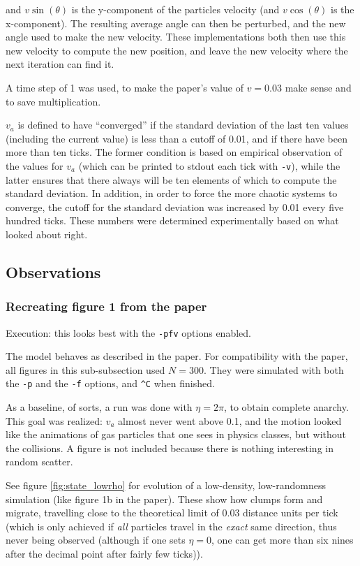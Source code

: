 \documentclass{article}
\begin{document}
\noindent
and $v\sin(\theta)$ is the y-component of the particles velocity (and
$v\cos(\theta)$ is the x-component).  The resulting average angle can then be
perturbed, and the new angle used to make the new velocity.  These
implementations both then use this new velocity to compute the new position, and
leave the new velocity where the next iteration can find it.


A time step of 1 was used, to make the paper's value of $v=0.03$ make sense and
to save multiplication.


$v_a$ is defined to have ``converged'' if the standard deviation of the last ten
values (including the current value) is less than a cutoff of 0.01, and if there
have been more than ten ticks.  The former condition is based on empirical
observation of the values for $v_a$ (which can be printed to stdout each tick
with \verb|-v|), while the latter ensures that there always will be ten elements
of which to compute the standard deviation.  In addition, in order to force the
more chaotic systems to converge, the cutoff for the standard deviation was
increased by 0.01 every five hundred ticks.  These numbers were determined
experimentally based on what looked about right.

\subsection{Observations} %

\subsubsection{Recreating figure 1 from the paper}

Execution: this looks best with the \verb|-pfv| options enabled.

The model behaves as described in the paper.  For compatibility with the paper,
all figures in this sub-subsection used $N=300$.  They were simulated with both
the \verb|-p| and the \verb|-f| options, and \verb|^C| when finished.


As a baseline, of sorts, a run was done with $\eta=2\pi$, to obtain complete
anarchy.  This goal was realized: $v_a$ almost never went above 0.1, and the
motion looked like the animations of gas particles that one sees in physics
classes, but without the collisions.  A figure is not included because there is
nothing interesting in random scatter.


See figure \ref{fig:state_lowrho} for evolution of a low-density, low-randomness
simulation (like figure 1b in the paper).  These show how clumps form and
migrate, travelling close to the theoretical limit of 0.03 distance units per
tick (which is only achieved if \emph{all} particles travel in the \emph{exact}
same direction, thus never being observed (although if one sets $\eta=0$, one
can get more than six nines after the decimal point after fairly few ticks)).
\end{document}
